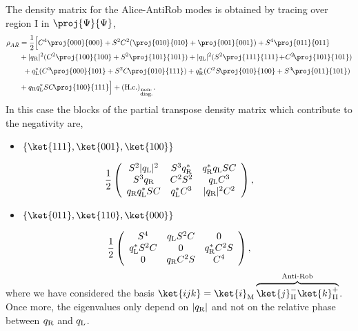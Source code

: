 The density matrix for the Alice-AntiRob modes is obtained by tracing over region $\text{I}$ in $\proj{\Psi}{\Psi}$, \begin{align}\label{ek2}
\nonumber\rho_{A\bar R}&=\frac{1}{2}\Big[C^4\proj{000}{000}+S^2C^2(\proj{010}{010}+\proj{001}{001})+S^4\proj{011}{011}\\*
\nonumber&+|q_\text{\text{R}}|^2(C^2\proj{100}{100}+S^2\proj{101}{101})+|q_\text{\text{L}}|^2(S^2\proj{111}{111}\!+\!C^2\!\proj{101}{101})\\*
\nonumber&\phantom{\Big[}+q_\text{\text{L}}^*(C^3\!\proj{000}{101}+S^2C\!\proj{010}{111})+q_\text{\text{R}}^*(C^2S\!\proj{010}{100}+S^3\!\proj{011}{101})\\*
&+q_\text{R} q_\text{L}^*SC\!\proj{100}{111}\Big]+(\text{H.c.})_{_{\substack{\text{non-}\\\text{diag.}}}}.
\end{align}
In this case the blocks of the partial transpose density matrix which contribute to the negativity are, 
\begin{itemize}
\item $\{\ket{111},\ket{001},\ket{100}\}$
\end{itemize}
\begin{equation}
\frac12\left(\begin{array}{ccc}
 S^2|q_\text{\text{L}}|^2& S^3q_\text{\text{R}}^*&q_\text{R}^* q_\text{L}SC\\
S^3q_\text{\text{R}}& C^2S^2& q_\text{\text{L}} C^3\\
q_\text{R} q_\text{L}^*SC & q_\text{\text{L}}^* C^3&|q_\text{\text{R}}|^2C^2\\
\end{array}\right),
\end{equation}
\begin{itemize}
\item $\{\ket{011},\ket{110},\ket{000}\}$
\end{itemize}
\begin{equation}
\frac12\left(\begin{array}{ccc}
S^4&q_\text{\text{L}}S^2C&0\\
q_\text{\text{L}}^*S^2C& 0 & q_\text{\text{R}}^*C^2S \\
0& q_\text{\text{R}}C^2S & C^4 \\
\end{array}\right),
\end{equation}
where we have considered the basis $\ket{ijk}=\ket{i}_\text{M}\overbrace{\ket{j}_\text{II}^-\ket{k}^+_\text{II}}^{\text{Anti-Rob}}$. Once more, the eigenvalues only depend on $|q_\text{\text{R}}|$ and not on the relative phase between $q_\text{\text{R}}$ and $q_\text{\text{L}}$.


